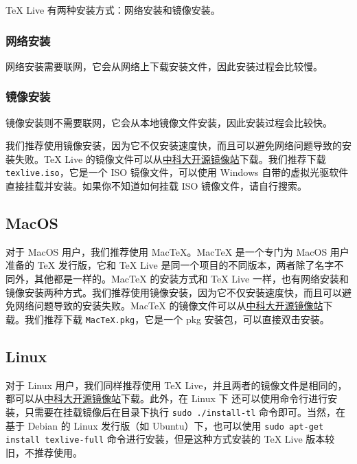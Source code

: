 TeX Live 有两种安装方式：网络安装和镜像安装。

\subsubsection{网络安装}

网络安装需要联网，它会从网络上下载安装文件，因此安装过程会比较慢。

\subsubsection{镜像安装}

镜像安装则不需要联网，它会从本地镜像文件安装，因此安装过程会比较快。

我们推荐使用镜像安装，因为它不仅安装速度快，而且可以避免网络问题导致的安装失败。TeX Live 的镜像文件可以从\href{https://mirrors.ustc.edu.cn/CTAN/systems/texlive/Images/}{中科大开源镜像站}下载。我们推荐下载 \texttt{texlive.iso}，它是一个 ISO 镜像文件，可以使用 Windows 自带的虚拟光驱软件直接挂载并安装。如果你不知道如何挂载 ISO 镜像文件，请自行搜索。

\subsection{MacOS}

对于 MacOS 用户，我们推荐使用 MacTeX。MacTeX 是一个专门为 MacOS 用户准备的 TeX 发行版，它和 TeX Live 是同一个项目的不同版本，两者除了名字不同外，其他都是一样的。MacTeX 的安装方式和 TeX Live 一样，也有网络安装和镜像安装两种方式。我们推荐使用镜像安装，因为它不仅安装速度快，而且可以避免网络问题导致的安装失败。MacTeX 的镜像文件可以从\href{https://mirrors.ustc.edu.cn/CTAN/systems/mac/mactex/}{中科大开源镜像站}下载。我们推荐下载 \texttt{MacTeX.pkg}，它是一个 pkg 安装包，可以直接双击安装。

\subsection{Linux}

对于 Linux 用户，我们同样推荐使用 TeX Live，并且两者的镜像文件是相同的，都可以从\href{https://mirrors.ustc.edu.cn/CTAN/systems/texlive/Images/}{中科大开源镜像站}下载。此外，在 Linux 下 还可以使用命令行进行安装，只需要在挂载镜像后在目录下执行 \texttt{sudo ./install-tl} 命令即可。当然，在基于 Debian 的 Linux 发行版（如 Ubuntu）下，也可以使用 \texttt{sudo apt-get install texlive-full} 命令进行安装，但是这种方式安装的 TeX Live 版本较旧，不推荐使用。


